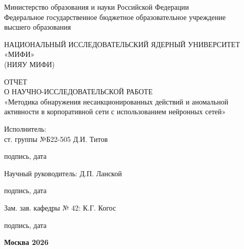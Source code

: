 \thispagestyle{empty}

\begin{center}
  Министерство образования и науки Российской Федерации \\
    Федеральное государственное бюджетное образовательное учреждение \\
    высшего образования

НАЦИОНАЛЬНЫЙ ИССЛЕДОВАТЕЛЬСКИЙ ЯДЕРНЫЙ УНИВЕРСИТЕТ \\
    «МИФИ» \\ (НИЯУ МИФИ)

  \vspace{20pt}

\end{center}
  
\vfill

\begin{center}
  ОТЧЕТ \\ О НАУЧНО-ИССЛЕДОВАТЕЛЬСКОЙ РАБОТЕ \\
    «Методика обнаружения несанкционированных действий и аномальной активности в корпоративной сети с использованием нейронных сетей»
\end{center}

\vfill

    \noindent Исполнитель: \\
    ст. группы №Б22-505 \hfill Д.И. Титов 
    \vspace{-10pt}
    \begin{center} подпись, дата \end{center}
    
    \noindent Научный руководитель: \hfill Д.П. Ланской
    \vspace{-10pt}
    \begin{center} подпись, дата \end{center}

    \noindent Зам. зав. кафедры № 42: \hfill К.Г. Когос
    \vspace{-10pt}
    \begin{center} подпись, дата \end{center}
\vfill

\begin{center}
  \textbf{Москва 2026}
\end{center}
